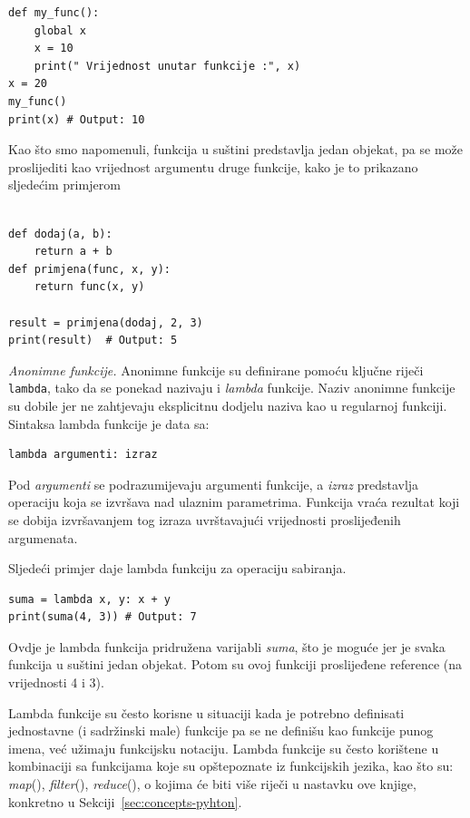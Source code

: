 \begin{verbatim}
def my_func():
    global x
    x = 10
    print(" Vrijednost unutar funkcije :", x)
x = 20
my_func()
print(x) # Output: 10
\end{verbatim}

Kao što smo napomenuli, funkcija u suštini predstavlja jedan objekat, pa se može proslijediti kao vrijednost argumentu druge funkcije, kako je to prikazano sljedećim primjerom
\begin{verbatim}

def dodaj(a, b):
    return a + b
def primjena(func, x, y):
    return func(x, y)

result = primjena(dodaj, 2, 3)
print(result)  # Output: 5
  \end{verbatim}

\textit{Anonimne funkcije.}  Anonimne funkcije su definirane pomoću ključne riječi \texttt{lambda}, tako da se ponekad nazivaju i \textit{lambda} funkcije.  Naziv anonimne funkcije su dobile jer ne zahtjevaju eksplicitnu dodjelu naziva kao u regularnoj funkciji. Sintaksa lambda funkcije je data sa:

\begin{verbatim}
lambda argumenti: izraz
\end{verbatim}
Pod \textit{argumenti} se podrazumijevaju argumenti funkcije, a \textit{izraz} predsta\-vlja operaciju koja se izvršava nad ulaznim parametrima. Funkcija vraća rezultat koji se dobija izvršavanjem tog izraza uvrštavajući vrije\-dnosti prosli\-jeđenih argumenata. 

Sljedeći primjer daje lambda funkciju za operaciju sabiranja.
\begin{verbatim}
suma = lambda x, y: x + y
print(suma(4, 3)) # Output: 7
\end{verbatim}

Ovdje je lambda funkcija pridružena varijabli \textit{suma}, što je moguće jer je svaka funkcija u suštini jedan objekat. Potom su ovoj funkciji proslijeđene reference (na vrijednosti 4 i 3). 

Lambda funkcije su često korisne u situaciji kada je potrebno defini\-sati jednostavne (i sadržinski male) funkcije pa  se ne definišu kao funkcije punog imena, već užimaju funkcijsku notaciju.  Lambda funkcije su često korištene u kombinaciji sa funkcijama koje su opštepoznate iz funkcijskih jezika, kao što su: \textit{map}(), \textit{filter}(), \textit{reduce}(), o kojima će biti više riječi u nastavku ove knjige, konkretno u Sekciji~\ref{sec:concepts-pyhton}. 




